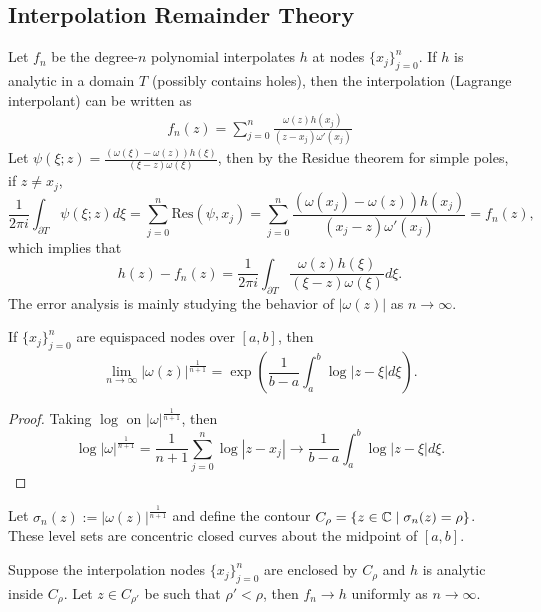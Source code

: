 \subsection{Interpolation Remainder Theory}
\label{SSec: 2-Int-Rem-The}
Let $f_n$ be the degree-$n$ polynomial interpolates $h$ at nodes $\{x_j\}_{j=0}^n$. If $h$ is analytic in a domain $T$ (possibly contains holes),  then the interpolation (Lagrange interpolant) can be written as 
\begin{eqnarray}
    f_n(z) = \sum_{j=0}^n \frac{\omega(z) h(x_j)}{(z - x_j) \omega'(x_j)}
\end{eqnarray}
Let $\psi(\xi; z) = \frac{(\omega(\xi) - \omega(z)) h(\xi)}{(\xi - z) \omega(\xi)}$, then by the Residue theorem for simple poles, if $z \neq x_j$,  
\begin{equation}
    \frac{1}{2\pi i}\int_{\partial T} \psi(\xi; z) d\xi = \sum_{j=0}^n \mathrm{Res}(\psi, x_j) = \sum_{j=0}^n \frac{(\omega(x_j) - \omega(z)) h(x_j)}{(x_j - z)\omega'(x_j)} = f_n(z),
\end{equation}
which implies that 
\begin{equation}
    h(z) - f_n(z) = \frac{1}{2\pi i}\int_{\partial T} \frac{\omega(z) h(\xi)}{(\xi - z)\omega(\xi)} d\xi.
\end{equation}
The error analysis is mainly studying the behavior of $|\omega(z)|$ as $n\to \infty$.
\begin{lemma}
\label{Lem: 2-Ome-Lim}
    If $\{x_j\}_{j=0}^n$ are equispaced nodes over $[a, b]$, then 
    \begin{equation}
        \lim_{n\to\infty} |\omega(z)|^{\frac{1}{n+1}} = \exp\left(\frac{1}{b - a}\int_a^b \log|z-\xi| d\xi \right).
    \end{equation}
\end{lemma}
\begin{proof}
    Taking $\log$ on $|\omega|^{\frac{1}{n+1}}$, then 
    \begin{equation}
        \log |\omega|^{\frac{1}{n+1}} = \frac{1}{n+1}\sum_{j=0}^n \log |z - x_j|\to \frac{1}{b-a}\int_a^b \log|z - \xi| d\xi. 
    \end{equation}
\end{proof}
Let $\sigma_n(z):= |\omega(z)|^{\frac{1}{n+1}}$ and define the contour $C_{\rho} = \{z\in \mathbb C\mid \sigma_n(z) = \rho\}$. These level sets are concentric closed curves about the midpoint of $[a,b]$.
\begin{lemma}
\label{Lem: 2-Ana-Uni-Con}
    Suppose the interpolation nodes $\{x_j\}_{j=0}^n$ are enclosed by $C_{\rho}$ and $h$ is analytic inside $C_{\rho}$. Let $z\in C_{\rho'}$ be such that $\rho'<\rho$, then $f_n\to h$ uniformly as $n\to\infty$. 
\end{lemma}
